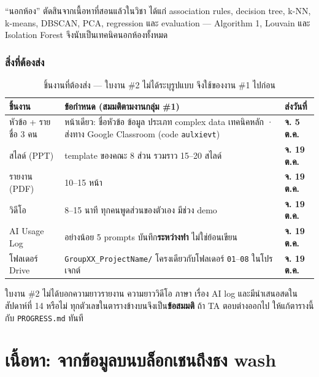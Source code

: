 \documentclass[11pt,a4paper]{article}
\newcommand{\sansall}{\sffamily}
\newcommand{\code}[1]{\texttt{#1}}
\newcommand{\thd}[1]{\sansall\bfseries #1}
\begin{document}
``นอกห้อง'' ตัดสินจากเนื้อหาที่สอนแล้วในวิชา ได้แก่ association rules, decision tree,
k-NN, k-means, DBSCAN, PCA, regression และ evaluation ---
Algorithm 1, Louvain และ Isolation Forest จึงนับเป็นเทคนิคนอกห้องทั้งหมด

\section{สิ่งที่ต้องส่ง}

\begin{table}[H]
\centering\small
\begin{tabular}{L{3.4cm}L{7.2cm}L{3.8cm}}
\toprule
\thd{ชิ้นงาน} & \thd{ข้อกำหนด (สมมติตามงานกลุ่ม \#1)} & \thd{ส่งวันที่} \\
\midrule
หัวข้อ + รายชื่อ 3 คน & หน้าเดียว: ชื่อหัวข้อ ข้อมูล ประเภท complex data เทคนิคหลัก ·
  ส่งทาง Google Classroom (code \code{aulxievt}) & \textbf{จ. 5 ต.ค.} \\
\addlinespace
สไลด์ (PPT) & template ของคณะ 8 ส่วน รวมราว 15--20 สไลด์ & \textbf{จ. 19 ต.ค.} \\
\addlinespace
รายงาน (PDF) & 10--15 หน้า & \textbf{จ. 19 ต.ค.} \\
\addlinespace
วิดีโอ & 8--15 นาที ทุกคนพูดส่วนของตัวเอง มีช่วง demo & \textbf{จ. 19 ต.ค.} \\
\addlinespace
AI Usage Log & อย่างน้อย 5 prompts บันทึก\textbf{ระหว่างทำ} ไม่ใช่ย้อนเขียน & \textbf{จ. 19 ต.ค.} \\
\addlinespace
โฟลเดอร์ Drive & \code{GroupXX\_ProjectName/} โครงเดียวกับโฟลเดอร์ \code{01}--\code{08} ในโปรเจกต์ & \textbf{จ. 19 ต.ค.} \\
\bottomrule
\end{tabular}
\caption{ชิ้นงานที่ต้องส่ง --- ใบงาน \#2 ไม่ได้ระบุรูปแบบ จึงใช้ของงาน \#1 ไปก่อน}
\end{table}

\begin{warnbox}[title={ต้องถาม TA ให้ได้คำตอบก่อน 5 ต.ค.}]
ใบงาน \#2 ไม่ได้บอกความยาวรายงาน ความยาววิดีโอ ภาษา เรื่อง AI log
และมีนำเสนอสดในสัปดาห์ที่ 14 หรือไม่ ทุกตัวเลขในตารางข้างบนจึงเป็น\textbf{ข้อสมมติ}
ถ้า TA ตอบต่างออกไป ให้แก้ตารางนี้กับ \code{PROGRESS.md} ทันที
\end{warnbox}

\clearpage
\part{เนื้อหา: จากข้อมูลบนบล็อกเชนถึงธง wash}
\end{document}
